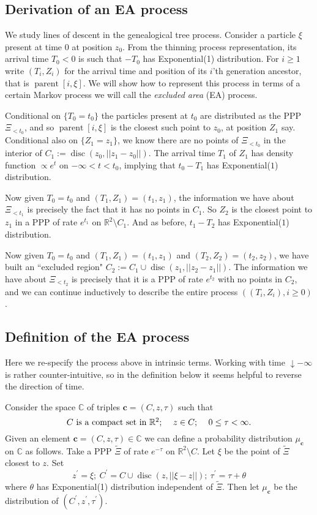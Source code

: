 \documentclass[12pt]{article}
\newcommand{\Reals}{{\mathbb{R}}}
\newcommand{\Complex}{{\mathbb{C}}}
\newcommand{\bc}{{\mathbf c}}
\DeclareMathOperator{\disc}{disc}
\DeclareMathOperator{\parent}{parent}
\begin{document}
\subsection{Derivation of an EA process}
\label{sec:line}
We study lines of descent in the genealogical tree process.
Consider a particle $\xi$ present at time $0$ at position $z_0$.  
From the  thinning process representation, its arrival time $T_0 < 0$ is such that $- T_0$ has  Exponential(1) distribution.
For $i \ge 1$ write $(T_i,Z_i)$ for the arrival time and position of its $i$'th generation ancestor, that is  $\parent[i,\xi]$.
We will show how to  represent this process 
in terms of a certain Markov process we will call the {\em excluded area} (EA) process. 

Conditional on $\{T_0 = t_0\}$ the particles present at $t_0$ are distributed as the PPP $\Xi_{< t_0}$, 
and so $\parent[i,\xi]$ is the closest such point to $z_0 $, at position $Z_1$ say.
Conditional also on $\{Z_1 = z_1\}$, 
we know there are no points of $\Xi_{< t_0}$ in the interior of
$C_1:= \disc(z_0, ||z_1 - z_0||)$.
The arrival time $T_1$ of $Z_1$ has density function 
$\propto e^t$ on $-\infty < t < t_0$, implying that 
$t_0 - T_1$ has Exponential($1$) distribution. 

Now given $T_0 = t_0$ and $(T_1,Z_1) = (t_1,z_1)$, the information we have about $\Xi_{< t_1}$ is precisely 
the fact that it has no points in $C_1$.
So $Z_2$ is the closest point to $z_1$ in a PPP of rate $e^{t_1}$ 
on $\Reals^2 \setminus C_1$.
And as before, $t_1 - T_2$ has Exponential($1$) distribution.

Now given $T_0 = t_0$ and  $(T_1,Z_1) = (t_1,z_1)$ and $(T_2,Z_2) = (t_2,z_2)$, 
we have built an ``excluded region" 
$C_2 := C_1 \cup \disc(z_1, ||z_2 - z_1||)$.
The information we have about $\Xi_{< t_2}$  is precisely 
that it is a PPP of rate $e^{t_2}$ with no points in $C_2$, 
and we can continue inductively to describe the entire process 
$((T_i, Z_i), i \ge 0)$.



\subsection{Definition of the EA process}
Here we re-specify the process above in intrinsic terms.
 Working with time $ \downarrow - \infty$ is rather 
counter-intuitive, so in the definition below it seems helpful to reverse the direction of time.


Consider the space $\Complex$ of triples $\bc = (C,z,\tau)$ such that
\[ \mbox{$C$ is a compact set in $\Reals^2$; \quad 
$z \in C$; \quad 
$0 \le  \tau < \infty$}. \]
Given an element $\bc = (C,z,\tau) \in \Complex$
we can define a probability distribution $\mu_{\bc}$
on $\Complex$ as follows.
Take a PPP $\widetilde{\Xi}$ of rate $e^{- \tau}$ on $\Reals^2 \setminus C$.
Let $\xi$ be the point of $\widetilde{\Xi}$ closest to $z$.
Set
\[ z^\prime = \xi; \ C^\prime = C \cup \disc(z,||\xi - z||); \ 
\tau^\prime = \tau + \theta\]
 where $\theta$ has Exponential(1) 
distribution independent of $\widetilde{\Xi}$.
Then let $\mu_{\bc}$ be the distribution 
of $(C^\prime, z^\prime, \tau^\prime)$.
\end{document}
